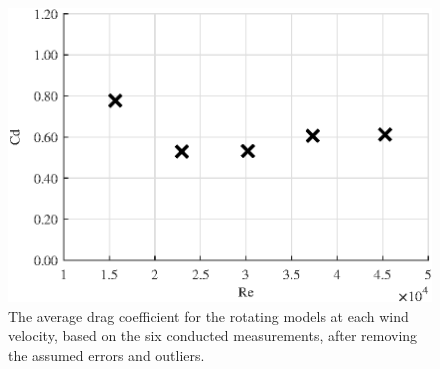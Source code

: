 


\begin{figure}[h!]
    \centering
    \includegraphics[width=\linewidth]{0_Images/RotationalAverageRe.eps}
    \caption{The average drag coefficient for the rotating models at each wind velocity, based on the six conducted measurements, after removing the assumed errors and outliers.}
    \label{fig:RotationalAvg}
\end{figure}



\FloatBarrier
